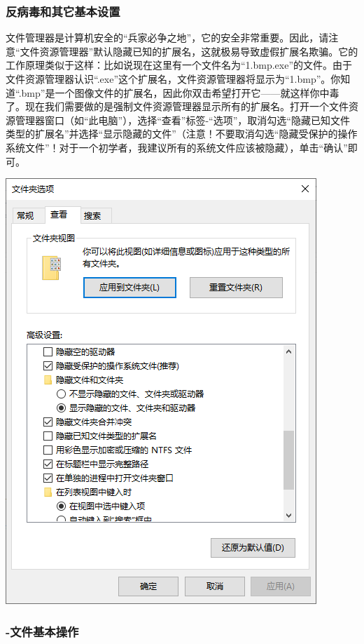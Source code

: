 \subsubsection{反病毒和其它基本设置}
文件管理器是计算机安全的“兵家必争之地”，它的安全非常重要。因此，请注意“文件资源管理器”默认隐藏已知的扩展名，这就极易导致虚假扩展名欺骗。它的工作原理类似于这样：比如说现在这里有一个文件名为“1.bmp.exe”的文件。由于文件资源管理器认识“.exe”这个扩展名，文件资源管理器将显示为“1.bmp”。你知道“.bmp”是一个图像文件的扩展名，因此你双击希望打开它——就这样你中毒了。现在我们需要做的是强制文件资源管理器显示所有的扩展名。打开一个文件资源管理器窗口（如“此电脑”），选择“查看”标签-“选项”，取消勾选“隐藏已知文件类型的扩展名”并选择“显示隐藏的文件”（注意！不要取消勾选“隐藏受保护的操作系统文件”！对于一个初学者，我建议所有的系统文件应该被隐藏），单击“确认”即可。
\begin{center}
	\includegraphics[scale=0.4]{pic/expset}
\end{center} \par
\subsubsection{-文件基本操作}
